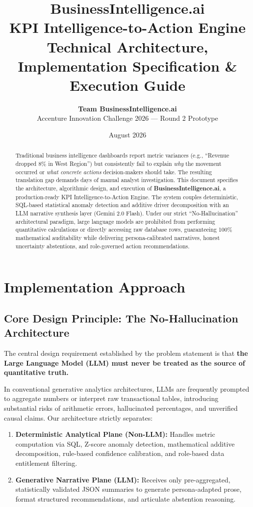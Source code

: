 \documentclass[11pt,a4paper]{article}
\title{\Huge\textbf{BusinessIntelligence.ai}\\[0.5em] \Large KPI Intelligence-to-Action Engine\\[0.3em] \normalsize Technical Architecture, Implementation Specification \& Execution Guide}
\author{\textbf{Team BusinessIntelligence.ai} \\ Accenture Innovation Challenge 2026 — Round 2 Prototype}
\date{August 2026}
\begin{document}
\maketitle

\begin{abstract}
Traditional business intelligence dashboards report metric variances (e.g., ``Revenue dropped 8\% in West Region'') but consistently fail to explain \textit{why} the movement occurred or \textit{what concrete actions} decision-makers should take. The resulting translation gap demands days of manual analyst investigation. This document specifies the architecture, algorithmic design, and execution of \textbf{BusinessIntelligence.ai}, a production-ready KPI Intelligence-to-Action Engine. The system couples deterministic, SQL-based statistical anomaly detection and additive driver decomposition with an LLM narrative synthesis layer (Gemini 2.0 Flash). Under our strict ``No-Hallucination'' architectural paradigm, large language models are prohibited from performing quantitative calculations or directly accessing raw database rows, guaranteeing 100\% mathematical auditability while delivering persona-calibrated narratives, honest uncertainty abstentions, and role-governed action recommendations.
\end{abstract}

\tableofcontents
\newpage

\section{Implementation Approach}

\subsection{Core Design Principle: The No-Hallucination Architecture}
The central design requirement established by the problem statement is that \textbf{the Large Language Model (LLM) must never be treated as the source of quantitative truth.} 

In conventional generative analytics architectures, LLMs are frequently prompted to aggregate numbers or interpret raw transactional tables, introducing substantial risks of arithmetic errors, hallucinated percentages, and unverified causal claims. Our architecture strictly separates:
\begin{enumerate}[leftmargin=*]
    \item \textbf{Deterministic Analytical Plane (Non-LLM):} Handles metric computation via SQL, Z-score anomaly detection, mathematical additive decomposition, rule-based confidence calibration, and role-based data entitlement filtering.
    \item \textbf{Generative Narrative Plane (LLM):} Receives only pre-aggregated, statistically validated JSON summaries to generate persona-adapted prose, format structured recommendations, and articulate abstention reasoning.
\end{enumerate}
\end{document}
